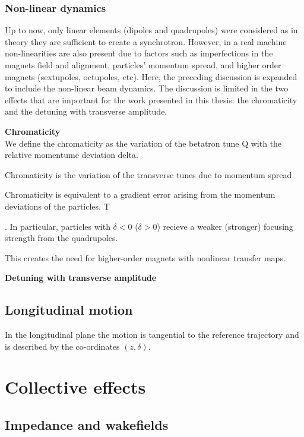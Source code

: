 \subsubsection{Non-linear dynamics}
Up to now, only linear elements (dipoles and quadrupoles) were considered as in theory they are sufficient to create a synchrotron. However, in a real machine non-linearities are also present due to factors such as imperfections in the magnets field and alignment, particles' momentum spread, and higher order magnets (sextupoles, octupoles, etc). Here, the preceding discussion is expanded to include the non-linear beam dynamics. The discussion is limited in the two effects that are important for the work presented in this thesis: the chromaticity and the detuning with transverse amplitude.

\textbf{Chromaticity}\\
We define the chromaticity as the variation of the betatron tune Q with the relative momentume deviation delta.

Chromaticity is the variation of the transverse tunes due to momentum spread 

Chromaticity is equivalent to a gradient
error arising from the momentum deviations of the particles. T

. In particular, particles with $\delta < 0$ ($\delta > 0$) recieve a weaker (stronger) focusing strength from the quadrupoles. %


This creates the need for higher-order magnets with nonlinear transfer
maps.

\textbf{Detuning with transverse amplitude}\\

\subsection{Longitudinal motion}
In the longitudinal plane the motion is tangential to the reference trajectory and is described by the co-ordinates $(z, \delta)$. 



\section{Collective effects}
\subsection{Impedance and wakefields}

